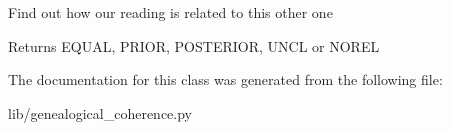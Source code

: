 \begin{DoxyVerb}Find out how our reading is related to this other one

Returns EQUAL, PRIOR, POSTERIOR, UNCL or NOREL
\end{DoxyVerb}
 

The documentation for this class was generated from the following file\+:\begin{DoxyCompactItemize}
\item 
lib/genealogical\+\_\+coherence.\+py\end{DoxyCompactItemize}

